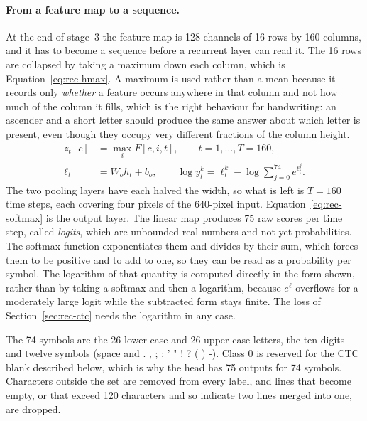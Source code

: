 \paragraph{From a feature map to a sequence.}
At the end of stage~3 the feature map is 128 channels of 16 rows by 160 columns, and it has to become a sequence before a recurrent layer can read it. The 16 rows are collapsed by taking a maximum down each column, which is Equation~\ref{eq:rec-hmax}. A maximum is used rather than a mean because it records only \emph{whether} a feature occurs anywhere in that column and not how much of the column it fills, which is the right behaviour for handwriting: an ascender and a short letter should produce the same answer about which letter is present, even though they occupy very different fractions of the column height.
\begin{align}
z_t[c]&=\max_{i}F[c,i,t],\qquad t=1,\ldots,T=160,\label{eq:rec-hmax}\\
\ell_t&=W_oh_t+b_o,\qquad \log y_t^k=\ell_t^k-\log\sum_{j=0}^{74}e^{\ell_t^j}.\label{eq:rec-softmax}
\end{align}
The two pooling layers have each halved the width, so what is left is $T=160$ time steps, each covering four pixels of the $640$-pixel input. Equation~\ref{eq:rec-softmax} is the output layer. The linear map produces 75 raw scores per time step, called \emph{logits}, which are unbounded real numbers and not yet probabilities. The softmax function exponentiates them and divides by their sum, which forces them to be positive and to add to one, so they can be read as a probability per symbol. The logarithm of that quantity is computed directly in the form shown, rather than by taking a softmax and then a logarithm, because $e^{\ell}$ overflows for a moderately large logit while the subtracted form stays finite. The loss of Section~\ref{sec:rec-ctc} needs the logarithm in any case.

The 74 symbols are the 26 lower-case and 26 upper-case letters, the ten digits and twelve symbols (space and . , ; : ' " ! ? ( ) -). Class 0 is reserved for the CTC blank described below, which is why the head has 75 outputs for 74 symbols. Characters outside the set are removed from every label, and lines that become empty, or that exceed 120 characters and so indicate two lines merged into one, are dropped.

